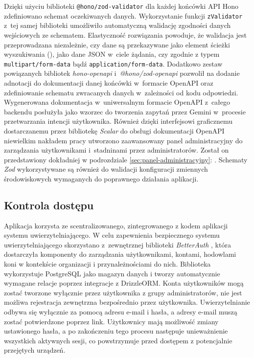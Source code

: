 Dzięki użyciu biblioteki \texttt{@hono/zod-validator} dla każdej końcówki API Hono zdefiniowano schemat oczekiwanych danych. Wykorzystanie funkcji \texttt{zValidator} z~tej samej biblioteki umożliwiło automatyczną walidację zgodności danych wejściowych ze schematem. Elastyczność rozwiązania powoduje, że walidacja jest przeprowadzana niezależnie, czy dane są przekazywane jako element ścieżki wyszukiwania (), jako dane JSON w~ciele żądania, czy zgodnie z typem \texttt{multipart/form-data} bądź \texttt{application/form-data}. Dodatkowo zestaw powiązanych bibliotek \textit{hono-openapi} i~\textit{@hono/zod-openapi} pozwolił na dodanie adnotacji do dokumentacji danej końcówki w~formacie OpenAPI oraz zdefiniowanie schematu zwracanych danych w~zależności od kodu odpowiedzi. Wygenerowana dokumentacja w~uniwersalnym formacie OpenAPI z~całego backendu posłużyła jako wzorzec do tworzenia zapytań przez Gemini w~procesie przetwarzania intencji użytkownika. Również dzięki interfejsowi graficznemu dostarczanemu przez bibliotekę \textit{Scalar} \cite{scalar} do obsługi dokumentacji OpenAPI niewielkim nakładem pracy utworzono zaawansowany panel administracyjny do zarządzania użytkownikami i~stadninami przez administratorów. Został on przedstawiony dokładniej w podrozdziale \ref{sec:panel-administracyjny}: . Schematy \textit{Zod} wykorzystywane są również do walidacji konfiguracji zmiennych środowiskowych wymaganych do poprawnego działania aplikacji. 

\subsection{Kontrola dostępu} \label{sec:kontrola-dostepu}

Aplikacja  korzysta ze scentralizowanego, zintegrowanego z kodem aplikacji systemu uwierzytelniającego. W celu zapewnienia bezpiecznego systemu uwierzytelniającego skorzystano z~zewnętrznej biblioteki \textit{BetterAuth} \cite{better_auth}, która dostarczyła komponenty do zarządzania użytkownikami, kontami, hodowlami koni w kontekście organizacji i przynależnościami do nich. Biblioteka wykorzystuje PostgreSQL jako magazyn danych i tworzy automatycznie wymagane relacje poprzez integracje z DrizzleORM. Konta użytkowników mogą zostać tworzone wyłącznie przez użytkownika z grupy administratorów, nie jest możliwa rejestracja zewnętrzna bezpośrednio przez użytkownika. Uwierzytelnianie odbywa się wyłącznie za pomocą adresu e-mail i hasła, a adresy e-mail muszą zostać potwierdzone poprzez link. Użytkownicy mają możliwość zmiany ustawionego hasła, a po zakończeniu tego procesu następuje unieważnienie wszystkich aktywnych sesji, co powstrzymuje przed dostępem z potencjalnie przejętych urządzeń.

